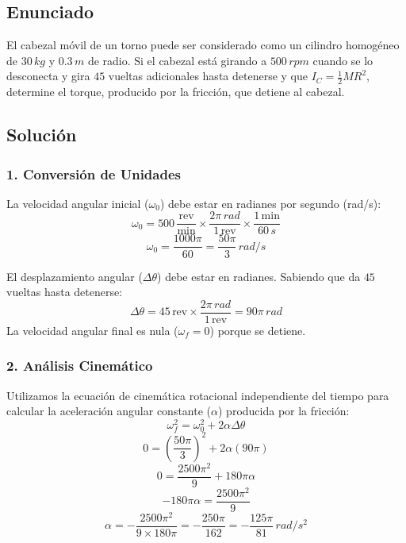 \documentclass[12pt, a4paper]{article}
\begin{document}
\newpage

\subsection*{Enunciado}
El cabezal móvil de un torno puede ser considerado como un cilindro homogéneo de $30 \, \si{kg}$ y $0.3 \, \si{m}$ de radio. Si el cabezal está girando a $500 \, \si{rpm}$ cuando se lo desconecta y gira $45$ vueltas adicionales hasta detenerse y que $I_C = \frac{1}{2} M R^2$, determine el torque, producido por la fricción, que detiene al cabezal.

\begin{center}
\end{center}

\subsection*{Solución}

\subsubsection*{1. Conversión de Unidades}
La velocidad angular inicial ($\omega_0$) debe estar en radianes por segundo (\si{rad/s}):
$$\omega_0 = 500 \, \frac{\text{rev}}{\text{min}} \times \frac{2\pi \, \si{rad}}{1 \, \text{rev}} \times \frac{1 \, \text{min}}{60 \, \si{s}}$$
$$\omega_0 = \frac{1000\pi}{60} = \frac{50\pi}{3} \, \si{rad/s}$$

El desplazamiento angular ($\Delta \theta$) debe estar en radianes. Sabiendo que da $45$ vueltas hasta detenerse:
$$\Delta \theta = 45 \, \text{rev} \times \frac{2\pi \, \si{rad}}{1 \, \text{rev}} = 90\pi \, \si{rad}$$
La velocidad angular final es nula ($\omega_f = 0$) porque se detiene.

\subsubsection*{2. Análisis Cinemático}
Utilizamos la ecuación de cinemática rotacional independiente del tiempo para calcular la aceleración angular constante ($\alpha$) producida por la fricción:
$$\omega_f^2 = \omega_0^2 + 2 \alpha \Delta \theta$$
$$0 = \left(\frac{50\pi}{3}\right)^2 + 2 \alpha (90\pi)$$
$$0 = \frac{2500\pi^2}{9} + 180\pi \alpha$$
$$-180\pi \alpha = \frac{2500\pi^2}{9}$$
$$\alpha = -\frac{2500\pi^2}{9 \times 180\pi} = -\frac{250\pi}{162} = -\frac{125\pi}{81} \, \si{rad/s^2}$$
\end{document}
